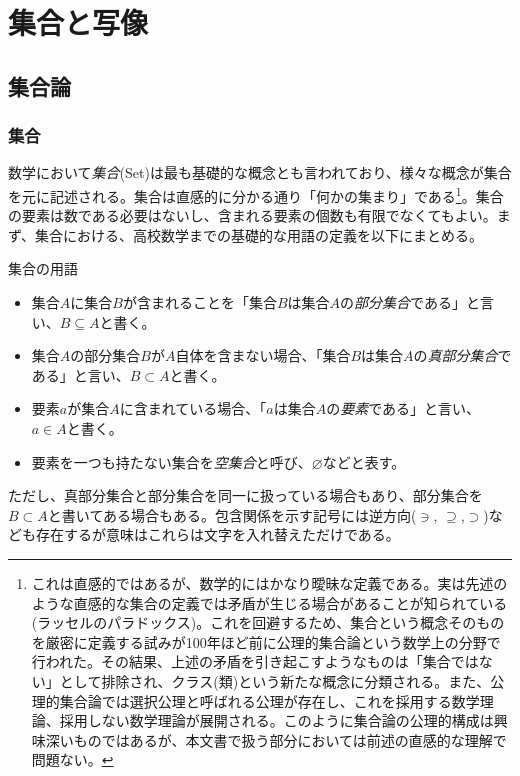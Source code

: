 \chapter{集合と写像}
\section{集合論}
\subsection{集合}
数学において\emph{集合}(Set)は最も基礎的な概念とも言われており、様々な概念が集合を元に記述される。集合は直感的に分かる通り「何かの集まり」である\footnote{これは直感的ではあるが、数学的にはかなり曖昧な定義である。実は先述のような直感的な集合の定義では矛盾が生じる場合があることが知られている(ラッセルのパラドックス)。これを回避するため、集合という概念そのものを厳密に定義する試みが100年ほど前に公理的集合論という数学上の分野で行われた。その結果、上述の矛盾を引き起こすようなものは「集合ではない」として排除され、クラス(類)という新たな概念に分類される。また、公理的集合論では選択公理と呼ばれる公理が存在し、これを採用する数学理論、採用しない数学理論が展開される。このように集合論の公理的構成は興味深いものではあるが、本文書で扱う部分においては前述の直感的な理解で問題ない。}。集合の要素は数である必要はないし、含まれる要素の個数も有限でなくてもよい。まず、集合における、高校数学までの基礎的な用語の定義を以下にまとめる。
\begin{definition*}{集合の用語}
	\begin{itemize}
		\item 集合\(A\)に集合\(B\)が含まれることを「集合\(B\)は集合\(A\)の\emph{部分集合}である」と言い、\(B \subseteq A\)と書く。
		\item 集合\(A\)の部分集合\(B\)が\(A\)自体を含まない場合、「集合\(B\)は集合\(A\)の\emph{真部分集合}である」と言い、\(B \subset A\)と書く。
		\item 要素\(a\)が集合\(A\)に含まれている場合、「\(a\)は集合\(A\)の\emph{要素}である」と言い、\(a \in A\)と書く。
		\item 要素を一つも持たない集合を\emph{空集合}と呼び、\(\varnothing\)などと表す。
	\end{itemize}
\end{definition*}
ただし、真部分集合と部分集合を同一に扱っている場合もあり、部分集合を\(B \subset A\)と書いてある場合もある。包含関係を示す記号には逆方向(\(\ni \), \(\supseteq\),\(\supset\))なども存在するが意味はこれらは文字を入れ替えただけである。

